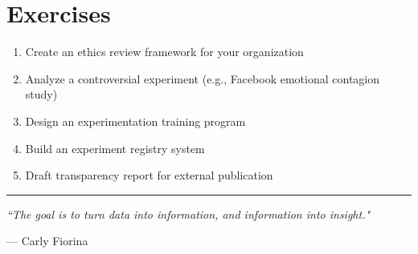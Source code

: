 \section{Exercises}

\begin{enumerate}
    \item Create an ethics review framework for your organization
    \item Analyze a controversial experiment (e.g., Facebook emotional contagion study)
    \item Design an experimentation training program
    \item Build an experiment registry system
    \item Draft transparency report for external publication
\end{enumerate}

\vspace{1cm}

\begin{center}
\rule{0.5\textwidth}{0.4pt}

\textit{``The goal is to turn data into information, and information into insight."}

— Carly Fiorina
\end{center}

